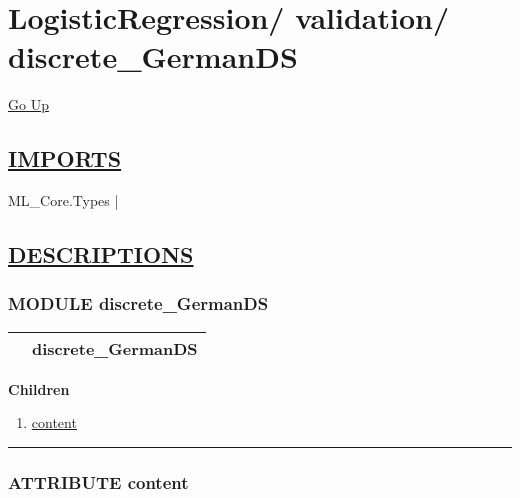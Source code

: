 \chapter*{\color{headfile}
{\large LogisticRegression\slash\hspace{0pt}}
{\large validation\slash\hspace{0pt}}
 \\
discrete_GermanDS
}
\hypertarget{ecldoc:toc:LogisticRegression.validation.discrete_GermanDS}{}
\hyperlink{ecldoc:toc:root/LogisticRegression/validation}{Go Up}

\section*{\underline{\textsf{IMPORTS}}}
\begin{doublespace}
{\large
ML\_Core.Types |
}
\end{doublespace}

\section*{\underline{\textsf{DESCRIPTIONS}}}
\subsection*{\textsf{\colorbox{headtoc}{\color{white} MODULE}
discrete\_GermanDS}}

\hypertarget{ecldoc:LogisticRegression.validation.discrete_GermanDS}{}

{\renewcommand{\arraystretch}{1.5}
\begin{tabularx}{\textwidth}{|>{\raggedright\arraybackslash}l|X|}
\hline
\hspace{0pt}\mytexttt{\color{red} } & \textbf{discrete\_GermanDS} \\
\hline
\end{tabularx}
}

\par


\textbf{Children}
\begin{enumerate}
\item \hyperlink{ecldoc:logisticregression.validation.discrete_germands.content}{content}
\end{enumerate}

\rule{\linewidth}{0.5pt}

\subsection*{\textsf{\colorbox{headtoc}{\color{white} ATTRIBUTE}
content}}

